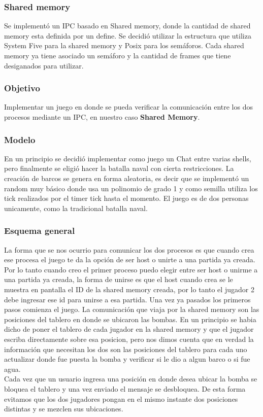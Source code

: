 \documentclass[10pt,a4paper]{article}
\begin{document}
	\subsubsection{Shared memory}
		Se implement\'o un IPC basado en Shared memory, donde la cantidad de shared memory esta definida por un define. Se decidi\'o utilizar la estructura que utiliza System Five para la shared memory y Posix para los sem\'aforos. Cada shared memory ya tiene asociado un sem\'aforo y la cantidad de frames que tiene desiganados para utilizar.
	\subsubsection{Objetivo}
		Implementar un juego en donde se pueda verificar la comunicaci\'on entre los dos procesos mediante un IPC, en nuestro caso \textbf{Shared Memory}.
	\subsubsection{Modelo}
		En un principio se decidi\'o implementar como juego un Chat entre varias shells, pero finalmente se eligi\'o hacer la batalla naval con cierta restricciones. La creaci\'on de barcos se genera en forma aleatoria, es decir que se implement\'o un random muy b\'asico donde usa un polinomio de grado 1 y como semilla utiliza los tick realizados por el timer tick hasta el momento. El juego es de dos personas unicamente, como la tradicional batalla naval.
	\subsubsection{Esquema general}
		La forma que se nos ocurrio para comunicar los dos procesos es que cuando crea ese procesa el juego te da la opci\'on de ser host o unirte a una partida ya creada. Por lo tanto cuando creo el primer proceso puedo elegir entre ser host o unirme a una partida ya creada, la forma de unirse es que el host cuando crea se le muestra en pantalla el ID de la shared memory creada, por lo tanto el jugador 2 debe ingresar ese id para unirse a esa partida. Una vez ya pasados los primeros pasos comienza el juego. La comunicaci\'on que viaja por la shared memory son las posiciones del tablero en donde se ubicaron las bombas. En un principio se habia dicho de poner el tablero de cada jugador en la shared memory y que el jugador escriba directamente sobre esa posicion, pero nos dimos cuenta que en verdad la informaci\'on que necesitan los dos son las posiciones del tablero para cada uno actualizar donde fue puesta la bomba y verificar si le dio a algun barco o si fue agua. \\
		Cada vez que un usuario ingresa una posici\'on en donde desea ubicar la bomba se bloquea el tablero y una vez enviado el mensaje se desbloquea. De esta forma evitamos que los dos jugadores pongan en el mismo instante dos posiciones distintas y se mezclen sus ubicaciones.
\end{document}
